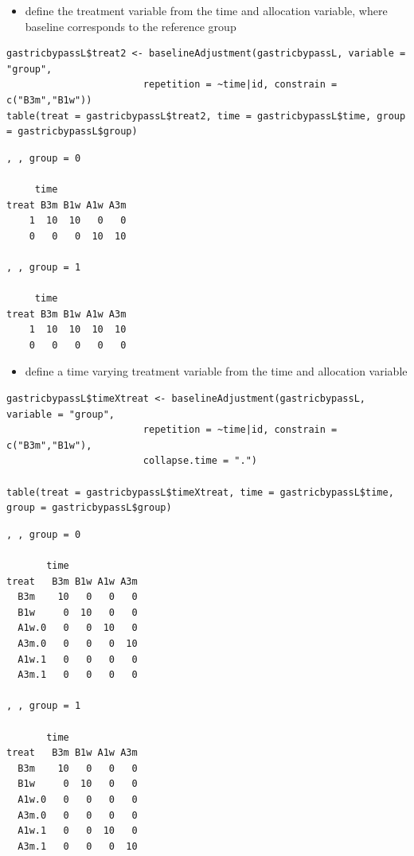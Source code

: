 \documentclass[12pt]{article}
\begin{document}
\begin{itemize}
\item define the treatment variable from the time and allocation variable,
where baseline corresponds to the reference group
\end{itemize}
\lstset{language=r,label= ,caption= ,captionpos=b,numbers=none}
\begin{lstlisting}
gastricbypassL$treat2 <- baselineAdjustment(gastricbypassL, variable = "group",
					    repetition = ~time|id, constrain = c("B3m","B1w"))
table(treat = gastricbypassL$treat2, time = gastricbypassL$time, group = gastricbypassL$group)
\end{lstlisting}

\begin{verbatim}
, , group = 0

     time
treat B3m B1w A1w A3m
    1  10  10   0   0
    0   0   0  10  10

, , group = 1

     time
treat B3m B1w A1w A3m
    1  10  10  10  10
    0   0   0   0   0
\end{verbatim}

\begin{itemize}
\item define a time varying treatment variable from the time and allocation variable
\end{itemize}
\lstset{language=r,label= ,caption= ,captionpos=b,numbers=none}
\begin{lstlisting}
gastricbypassL$timeXtreat <- baselineAdjustment(gastricbypassL, variable = "group",
						repetition = ~time|id, constrain = c("B3m","B1w"),
						collapse.time = ".")

table(treat = gastricbypassL$timeXtreat, time = gastricbypassL$time, group = gastricbypassL$group)
\end{lstlisting}

\begin{verbatim}
, , group = 0

       time
treat   B3m B1w A1w A3m
  B3m    10   0   0   0
  B1w     0  10   0   0
  A1w.0   0   0  10   0
  A3m.0   0   0   0  10
  A1w.1   0   0   0   0
  A3m.1   0   0   0   0

, , group = 1

       time
treat   B3m B1w A1w A3m
  B3m    10   0   0   0
  B1w     0  10   0   0
  A1w.0   0   0   0   0
  A3m.0   0   0   0   0
  A1w.1   0   0  10   0
  A3m.1   0   0   0  10
\end{verbatim}
\end{document}
